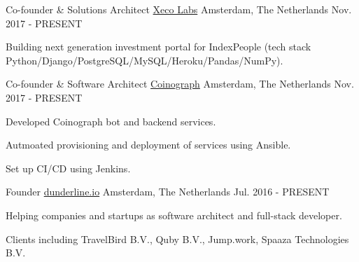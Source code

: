 

\begin{cventries}

  \cventry
    {Co-founder \& Solutions Architect} %
    {\href{https://www.xecolabs.com}{Xeco Labs}} %
    {Amsterdam, The Netherlands} %
    {Nov. 2017 - PRESENT} %
    {
      \begin{cvitems} %
      \item {Building next generation investment portal for IndexPeople (tech stack Python/Django/PostgreSQL/MySQL/Heroku/Pandas/NumPy).}
      \end{cvitems}
	}

  \cventry
    {Co-founder \& Software Architect} %
    {\href{https://www.coinograph.io}{Coinograph}} %
    {Amsterdam, The Netherlands} %
    {Nov. 2017 - PRESENT} %
    {
      \begin{cvitems} %
      \item {Developed Coinograph bot and backend services.}
      \item {Autmoated provisioning	and deployment of services using Ansible.}
      \item {Set up CI/CD using Jenkins.}
      \end{cvitems}
    }

  \cventry
    {Founder} %
    {\href{https://www.dunderline.io/}{dunderline.io}} %
    {Amsterdam, The Netherlands} %
    {Jul. 2016 - PRESENT} %
    {
      \begin{cvitems} %
        \item {Helping companies and startups as software architect and full-stack developer.}
        \item {Clients including TravelBird B.V., Quby B.V., Jump.work, Spaaza Technologies B.V.}
      \end{cvitems}
    }


\end{cventries}
